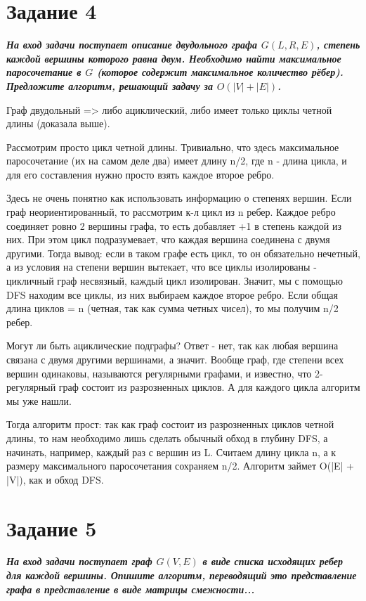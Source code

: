 \documentclass{article}
\begin{document}
\bigskip


\section*{\textbf{Задание 4}} \textbf{\textit{На вход задачи поступает описание двудольного графа $G(L, R, E)$, степень каждой вершины которого равна двум. Необходимо найти максимальное паросочетание в $G$ (которое содержит максимальное количество рёбер). Предложите алгоритм, решающий задачу за $O(|V | + |E|)$.}}

Граф двудольный => либо ациклический, либо имеет только циклы четной длины (доказала выше). 

Рассмотрим просто цикл четной длины. Тривиально, что здесь максимальное паросочетание (их на самом деле два) имеет длину n/2, где n - длина цикла, и для его составления нужно просто взять каждое второе ребро.

Здесь не очень понятно как использовать информацию о степенях вершин. Если граф неориентированный, то рассмотрим к-л цикл из n ребер. Каждое ребро соединяет ровно 2 вершины графа, то есть добавляет +1 в степень каждой из них. При этом цикл подразумевает, что каждая вершина соединена с двумя другими. Тогда вывод: если в таком графе есть цикл, то он обязательно нечетный, а из условия на степени вершин вытекает, что все циклы изолированы - цикличный граф несвязный, каждый цикл изолирован. Значит, мы с помощью DFS находим все циклы, из них выбираем каждое второе ребро. Если общая длина циклов = n (четная, так как сумма четных чисел), то мы получим n/2 ребер.

Могут ли быть ациклические подграфы? Ответ - нет, так как любая вершина связана с двумя другими вершинами, а значит. Вообще граф, где степени всех вершин одинаковы, называются регулярными графами, и известно, что 2-регулярный граф состоит из разрозненных циклов. А для каждого цикла алгоритм мы уже нашли.

Тогда алгоритм прост: так как граф состоит из разрозненных циклов четной длины, то нам необходимо лишь сделать обычный обход в глубину DFS, а начинать, например, каждый раз с вершин из L. Считаем длину цикла n, а к размеру максимального паросочетания сохраняем n/2. Алгоритм займет O(|E| + |V|), как и обход DFS.
\bigskip


\section*{\textbf{Задание 5}} \textbf{\textit{На вход задачи поступает граф $G(V, E)$ в виде списка исходящих ребер для каждой вершины. Опишите алгоритм, переводящий это представление графа в представление в виде матрицы смежности...}}
\end{document}
